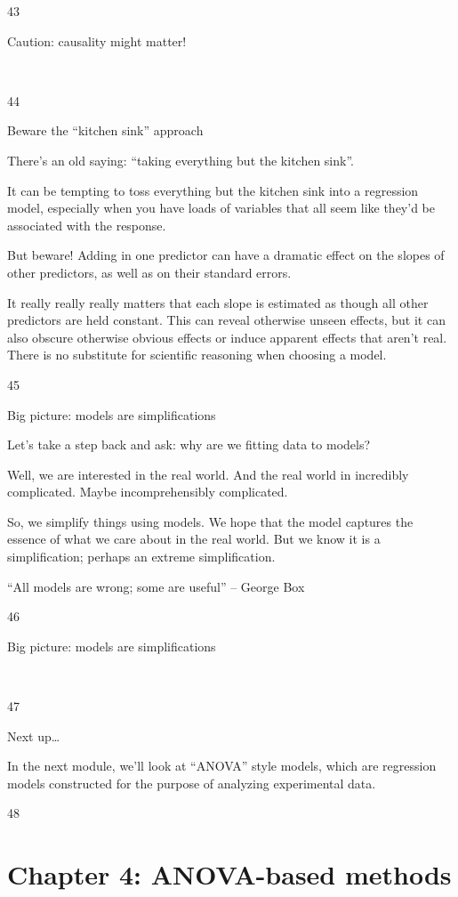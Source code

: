 \documentclass[
  letterpaper,
  DIV=11,
  numbers=noendperiod]{scrreprt}
\begin{document}
43

Caution: causality might matter!

~

44

Beware the ``kitchen sink'' approach

There's an old saying: ``taking everything but the kitchen sink''.

It can be tempting to toss everything but the kitchen sink into a
regression model, especially when you have loads of variables that all
seem like they'd be associated with the response.

But beware! Adding in one predictor can have a dramatic effect on the
slopes of other predictors, as well as on their standard errors.

It really really really matters that each slope is estimated as though
all other predictors are held constant. This can reveal otherwise unseen
effects, but it can also obscure otherwise obvious effects or induce
apparent effects that aren't real. There is no substitute for scientific
reasoning when choosing a model.

45

Big picture: models are simplifications

Let's take a step back and ask: why are we fitting data to models?

Well, we are interested in the real world. And the real world in
incredibly complicated. Maybe incomprehensibly complicated.

So, we simplify things using models. We hope that the model captures the
essence of what we care about in the real world. But we know it is a
simplification; perhaps an extreme simplification.

``All models are wrong; some are useful'' -- George Box

46

Big picture: models are simplifications

~

47

Next up\ldots{}

In the next module, we'll look at ``ANOVA'' style models, which are
regression models constructed for the purpose of analyzing experimental
data.

48


\hypertarget{chapter-4-anova-based-methods}{%
\chapter{Chapter 4: ANOVA-based
methods}\label{chapter-4-anova-based-methods}}
\end{document}
